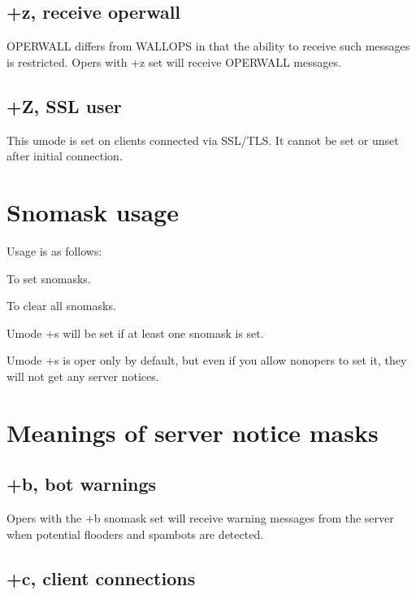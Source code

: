 \subsection{+z, receive operwall}

	OPERWALL differs from WALLOPS in that the ability to receive such
	messages is restricted. Opers with +z set will receive OPERWALL
	messages.


\subsection{+Z, SSL user}

	This umode is set on clients connected via SSL/TLS. It cannot be set or
	unset after initial connection.


\section{Snomask usage}
\label{snomaskusage}

	Usage is as follows:

      \literal{+\slash-{}}

	To set snomasks.

     

	To clear all snomasks.

	Umode +s will be set if at least one snomask is set.

	Umode +s is oper only by default, but even if you allow nonopers to set
	it, they will not get any server notices.


\section{Meanings of server notice masks}
\label{snomasklist}

\subsection{+b, bot warnings}

	Opers with the +b snomask set will receive warning messages from the
	server when potential flooders and spambots are detected.


\subsection{+c, client connections}

